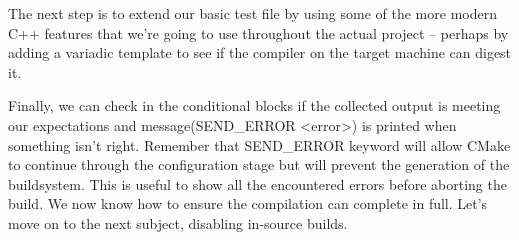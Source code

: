 The next step is to extend our basic test file by using some of the more modern C++ features that we’re going to use throughout the actual project – perhaps by adding a variadic template to see if the compiler on the target machine can digest it.

Finally, we can check in the conditional blocks if the collected output is meeting our expectations and message(SEND\_ERROR <error>) is printed when something isn’t right. Remember that SEND\_ERROR keyword will allow CMake to continue through the configuration stage but will prevent the generation of the buildsystem. This is useful to show all the encountered errors before aborting the build. We now know how to ensure the compilation can complete in full. Let’s move on to the next subject, disabling in-source builds.
























